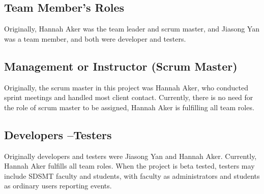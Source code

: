 \subsection{Team Member's Roles}
Originally, Hannah Aker was the team leader and scrum master, and Jiasong Yan was a team member, and both were developer and testers.
\subsection{Management or Instructor (Scrum Master)}
Originally, the scrum master in this project was Hannah Aker, who conducted sprint meetings and handled most client contact. Currently, there is no need for the role of scrum master to be assigned, Hannah Aker is fulfilling all team roles.
\subsection{Developers --Testers}
Originally developers and testers were Jiasong Yan and Hannah Aker. Currently, Hannah Aker fulfills all team roles. When the project is beta tested, testers may include SDSMT faculty and students, with faculty as administrators and students as ordinary users reporting events.
